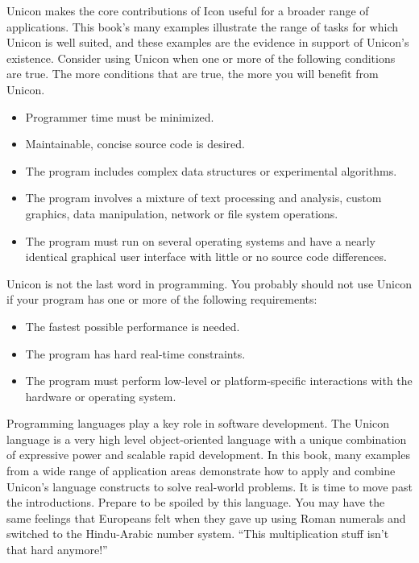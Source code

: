Unicon makes the core contributions of Icon useful
for a broader range of applications. This book's many
examples illustrate the range of tasks for which Unicon is well
suited, and these examples are the evidence in
support of Unicon's existence.
Consider using Unicon when one or more of the following conditions are
true. The more conditions that are true, the more you will
benefit from Unicon.
\begin{itemize} \itemsep0pt
\item Programmer time must be minimized.
\item Maintainable, concise source code is desired.
\item The program includes complex data structures or experimental
      algorithms.
\item The program involves a mixture of text processing and analysis, custom
      graphics, data manipulation, network or file system operations.
\item The program must run on several operating systems and have a
      nearly identical graphical user interface with little or no source code
      differences.
\end{itemize}
Unicon is not the last word in programming. You probably should not use
Unicon if your program has one or more of the following requirements:
\begin{itemize} \itemsep0pt
\item The fastest possible performance is needed.
\item The program has hard real-time constraints.
\item The program must perform low-level or platform-specific
      interactions with the hardware or operating system.
\end{itemize}
Programming languages play a key role in software development.
The Unicon language is a very high level
object-oriented language
with a unique combination of expressive power and scalable rapid
development. In this book, many examples from a wide range
of application areas demonstrate how to apply and combine Unicon's
language constructs to solve real-world problems.
It is time to move past the introductions. Prepare to be spoiled by
this language. You may have the same feelings that
Europeans felt when they gave up using Roman numerals and
switched to the Hindu-Arabic number system. ``This
multiplication stuff isn't that hard anymore!''
